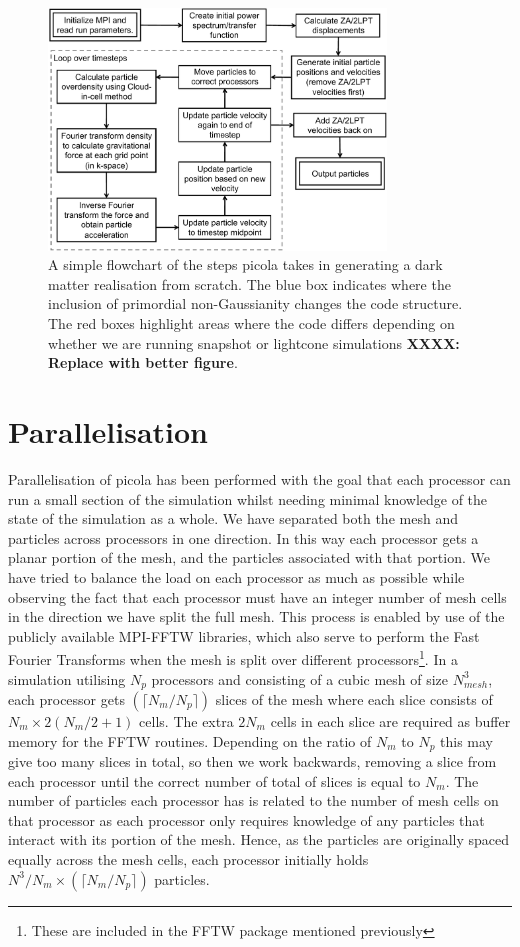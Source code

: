 \documentclass[5p,authoryear]{elsarticle}
\begin{document}
\begin{figure}
\centering
\includegraphics[width=0.8\textwidth]{PICOLAchart.pdf}
  \caption{A simple flowchart of the steps {\sc picola} takes in generating a dark matter realisation from scratch. The blue box indicates where the inclusion of primordial non-Gaussianity changes the code structure. The red boxes highlight areas where the code differs depending on whether we are running snapshot or lightcone simulations \textbf{XXXX: Replace with better figure}.}
  \label{PICOLAchart}
\end{figure}

\section{Parallelisation}
Parallelisation of {\sc picola} has been performed with the goal that each processor can run a small section of the simulation whilst needing minimal knowledge of the state of the simulation as a whole. We have separated both the mesh and particles across processors in one direction. In this way each processor gets a planar portion of the mesh, and the particles associated with that portion. We have tried to balance the load on each processor as much as possible while observing the fact that each processor must have an integer number of mesh cells in the direction we have split the full mesh. This process is enabled by use of the publicly available MPI-FFTW libraries, which also serve to perform the Fast Fourier Transforms when the mesh is split over different processors\footnote{These are included in the FFTW package mentioned previously}. In a simulation utilising $N_{p}$ processors and consisting of a cubic mesh of size $N_{mesh}^{3}$, each processor gets $(\lceil N_{m}/N_{p} \rceil)$ slices of the mesh where each slice consists of $N_{m}\times 2(N_{m}/2+1)$ cells. The extra $2N_{m}$ cells in each slice are required as buffer memory for the FFTW routines. Depending on the ratio of $N_{m}$ to $N_{p}$ this may give too many slices in total, so then we work backwards, removing a slice from each processor until the correct number of total of slices is equal to $N_{m}$. The number of particles each processor has is related to the number of mesh cells on that processor as each processor only requires knowledge of any particles that interact with its portion of the mesh. Hence, as the particles are originally spaced equally across the mesh cells, each processor initially holds $N^{3}/N_{m}\times(\lceil N_{m}/N_{p} \rceil)$ particles.
\end{document}
